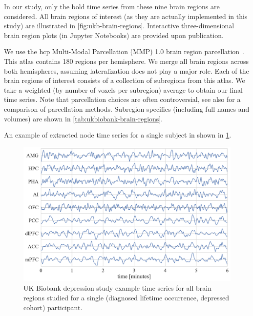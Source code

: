 In our study, only the \gls{bold} time series from these nine brain regions are considered.
All brain regions of interest (as they are actually implemented in this study) are illustrated in \cref{fig:ukb-brain-regions}.
Interactive three-dimensional brain region plots (in Jupyter Notebooks) are provided upon publication.

We use the \gls{hcp} Multi-Modal Parcellation (MMP) 1.0 brain region parcellation~\parencite{Glasser2016}.
This atlas contains 180 regions per hemisphere.
We merge all brain regions across both hemispheres, assuming lateralization does not play a major role.
Each of the brain regions of interest consists of a collection of subregions from this atlas.
We take a weighted (by number of voxels per subregion) average to obtain our final time series.
Note that parcellation choices are often controversial, see also \textcite{Arslan2018, Bryce2021} for a comparison of parcellation methods.
Subregion specifics (including full names and volumes) are shown in \cref{tab:ukbiobank-brain-regions}.



An example of extracted node time series for a single subject in shown in \cref{fig:ukb-example-time-series}.


\begin{figure}[t]
  \centering
  \includegraphics[width=\textwidth]{fig/ukbiobank/node_timeseries/diagnosed_lifetime_occurrence/depressed/time_series_regions_of_interest}
  \caption{
    UK Biobank depression study example time series for all brain regions studied for a single (diagnosed lifetime occurrence, depressed cohort) participant.
  }
  \label{fig:ukb-example-time-series}
\end{figure}


